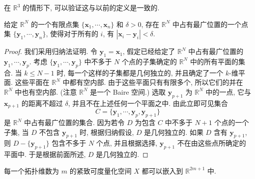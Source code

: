 在 $\mathbb{R}^{3}$ 的情形下, 可以验证这与以前的定义是一致的.

\begin{lemma}
\label{lemma:ch08-sec50-50-4}
给定 $\mathbb{R}^{N}$ 的一个有限点集 $\{\boldsymbol{x}_1,\cdots,\boldsymbol{x}_n\}$ 和 $\delta>0$, 存在 $\mathbb{R}^{N}$ 中占有最广位置的一个点集 $\{\boldsymbol{y}_1,\cdots,\boldsymbol{y}_n\}$, 使得对于所有的 $i$, 有 $|\boldsymbol{x}_i-\boldsymbol{y}_i|<\delta$.
\end{lemma}

\begin{proof}
我们采用归纳法证明. 令 $\boldsymbol{y}_1=\boldsymbol{x}_1$, 假定已经给定了 $\mathbb{R}^{N}$ 中占有最广位置的 $\boldsymbol{y}_1,\cdots,\boldsymbol{y}_p$. 考虑 $\{\boldsymbol{y}_1,\cdots,\boldsymbol{y}_p\}$ 中不多于 $N$ 个点的子集确定的 $\mathbb{R}^{N}$ 中的所有平面的集合. 当 $k\leqslant N-1$ 时, 每一个这样的子集都是几何独立的, 并且确定了一个 $k$-维平面. 这些平面在 $\mathbb{R}^{N}$ 中都有空内部. 由于这些平面只有有限多个, 所以它们的并在 $\mathbb{R}^{N}$ 中也有空内部. (注意 $\mathbb{R}^{N}$ 是一个 Baire 空间.) 选取 $\boldsymbol{y}_{p+1}$ 为 $\mathbb{R}^{N}$ 中的一点, 它与 $\boldsymbol{x}_{p+1}$ 的距离不超过 $\delta$, 并且不在上述任何一个平面之中. 由此立即可见集合
\[
C=\{\boldsymbol{y}_{1},\cdots,\boldsymbol{y}_{p},\boldsymbol{y}_{p+1}\}
\]
是 $\mathbb{R}^{N}$ 中占有最广位置的集合. 因为若令 $D$ 为包含 $C$ 中不多于 $N+1$ 个点的一个子集, 当 $D$ 不包含 $\boldsymbol{y}_{p+1}$ 时, 根据归纳假设, $D$ 是几何独立的. 如果 $D$ 含有 $\boldsymbol{y}_{p+1}$, 则 $D-\{\boldsymbol{y}_{p+1}\}$ 包含不多于 $N$ 个点, 并且根据选择, $\boldsymbol{y}_{p+1}$ 不在由这些点所确定的平面中. 于是根据前面所述, $D$ 是几何独立的.
\end{proof}

\begin{theorem}[嵌入定理]
\label{theorem:ch08-sec50-50-5}
每一个拓扑维数为 $m$ 的紧致可度量化空间 $X$ 都可以嵌入到 $\mathbb{R}^{2m+1}$ 中.
\end{theorem}

